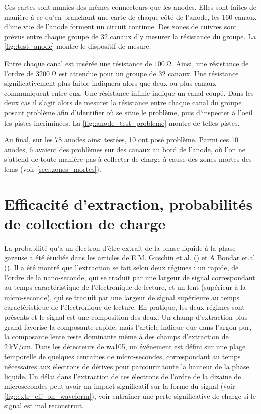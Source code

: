             Ces cartes sont munies des mêmes connecteurs que les anodes. Elles sont faites de manière à ce qu'en branchant une carte de chaque côté de l'anode, les 160 canaux d'une vue de l'anode forment un circuit continue. Des zones de cuivres sont prévus entre chaque groupe de 32 canaux d'y mesurer la résistance du groupe. La \autoref{fig::test_anode} montre le dispositif de mesure.
            
            Entre chaque canal est insérée une résistance de $\SI{100}{\ohm}$. Ainsi, une résistance de l'ordre de $\SI{3200}{\ohm}$ est attendue pour un groupe de 32 canaux. Une résistance significativement plus faible indiquera alors que deux ou plus canaux communiquent entre eux. Une résistance infinie indique un canal coupé. Dans les deux cas il s'agit alors de mesurer la résistance entre chaque canal du groupe posant problème afin d'identifier où se situe le problème, puis d'inspecter à l'oeil les pistes incriminées. La \autoref{fig::anode_test_probleme} montre de telles pistes.

            Au final, sur les 78 anodes ainsi testées, 10 ont posé problème. Parmi ces 10 anodes, 6 avaient des problèmes sur des canaux au bord de l'anode, où l'on ne s'attend de toute manière pas à collecter de charge à cause des zones mortes des \glspl{lem} (voir \autoref{sec::zones_mortes}).
                        
    \section{Efficacité d'extraction, probabilités de collection de charge}
    
        La probabilité qu'a un électron d'être extrait de la phase liquide à la phase gazeuse a été étudiée dans les articles de E.M. Guschin et.al. (\cite{Guschin}) et A.Bondar et.al. (\cite{Bondar}). Il a été montré que l'extraction se fait selon deux régimes : un rapide, de l'ordre de la nano-seconde, qui se traduit par une largeur de signal correspondant au temps caractéristique de l'électronique de lecture, et un lent (supérieur à la micro-seconde), qui se traduit par une largeur de signal supérieure au temps caractéristique de l'électronique de lecture. En pratique, les deux régimes sont présents et le signal est une composition des deux. Un champ d'extraction plus grand favorise la composante rapide, mais l'article \cite{Bondar} indique que dans l'argon pur, la composante lente reste dominante même à des champs d'extraction de $\SI{2}{\kilo\volt\per\centi\meter}$. Dans les détecteurs de \gls{wa105}, un événement est défini sur une plage temporelle de quelques centaines de micro-secondes, correspondant au temps nécessaires aux électrons de dérives pour parcourir toute la hauteur de la phase liquide. Un délai dans l'extraction de ces électrons de l'ordre de la dizaine de microsecondes peut avoir un impact significatif sur la forme du signal (voir \autoref{fig::extr_eff_on_waveform}), voir entraîner une perte significative de charge si le signal est mal reconstruit.
        
